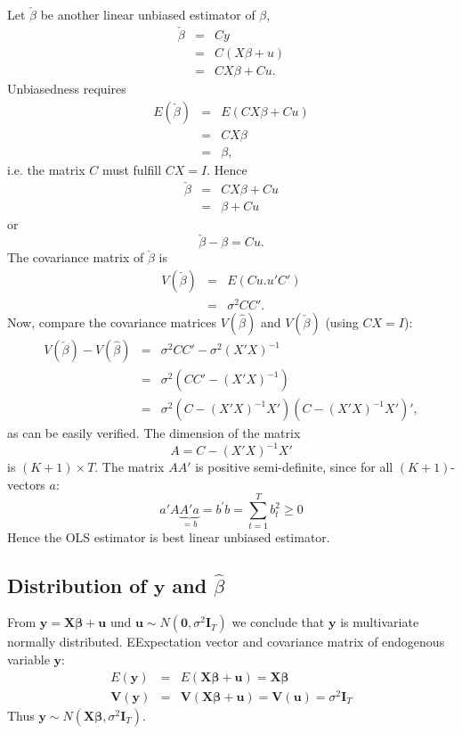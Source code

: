 \documentclass{article}
\begin{document}
Let $\check{\beta}$  be another linear unbiased estimator of $\beta $,
\begin{eqnarray*}
\check{\beta} &=&Cy \\
&=&C(X\beta +u) \\
&=&CX\beta +Cu.
\end{eqnarray*}
Unbiasedness requires
\begin{eqnarray*}
E(\check{\beta}) &=&E\left( CX\beta +Cu\right) \\
&=&CX\beta \\
&=&\beta ,
\end{eqnarray*}
i.e. the matrix $C$ must fulfill $CX=I$. Hence
\begin{eqnarray*}
\check{\beta} &=&CX\beta +Cu \\
&=&\beta +Cu
\end{eqnarray*}
or
\[ \check{\beta}-\beta =Cu. \]
The covariance matrix of $\check{\beta}$ is
\begin{eqnarray*}
V(\check{\beta}) &=&E(Cu.u'C') \\
&=&\sigma ^{2}CC'.
\end{eqnarray*}%
Now, compare the covariance matrices $V(\hat{\beta})$ and $V(\check{\beta})$ (using $CX=I$):
\begin{eqnarray*}
V(\check{\beta})-V(\hat{\beta}) &=&\sigma ^{2}CC'-\sigma
^{2}(X'X)^{-1} \\
&=&\sigma ^{2}\left( CC'-(X'X)^{-1}\right) \\
&=&\sigma ^{2}\left( C-(X'X)^{-1}X'\right) \left(
C-(X'X)^{-1}X'\right) ',
\end{eqnarray*}
as can be easily verified. The dimension of the matrix
\[ A=C-(X'X)^{-1}X' \]
is $(K+1) \times T$. The matrix $AA'$ is positive semi-definite, since for all $(K+1)$-vectors $a$:
\[ a'A\underbrace{A'a}_{=b}=b^{\prime
}b=\sum_{t=1}^{T}b_{t}^{2}\geq 0 \]
Hence the OLS estimator is best linear unbiased estimator.
\subsection*{Distribution of $\mathbf{y}$ and $\hat\beta$}

From $\mathbf{y}=\mathbf{X\beta }+\mathbf{u}$ und $\mathbf{u}\sim N(\mathbf{0},\sigma ^{2}\mathbf{I}_{T})$ 
we
conclude that $\mathbf{y}$ is multivariate normally distributed. EExpectation vector and covariance matrix of endogenous variable $\mathbf{y}$:
\begin{eqnarray*}
E(\mathbf{y}) &=&E(\mathbf{X\beta }+\mathbf{u})=\mathbf{X\beta } \\
\mathbf{V}(\mathbf{y}) &=&\mathbf{V}(\mathbf{X\beta }+\mathbf{u})=\mathbf{V}(\mathbf{u})=\sigma ^{2}\mathbf{I}_{T}
\end{eqnarray*}
Thus $\mathbf{y}\sim N(\mathbf{X\beta },\sigma ^{2}\mathbf{I}_{T})$.
\end{document}
